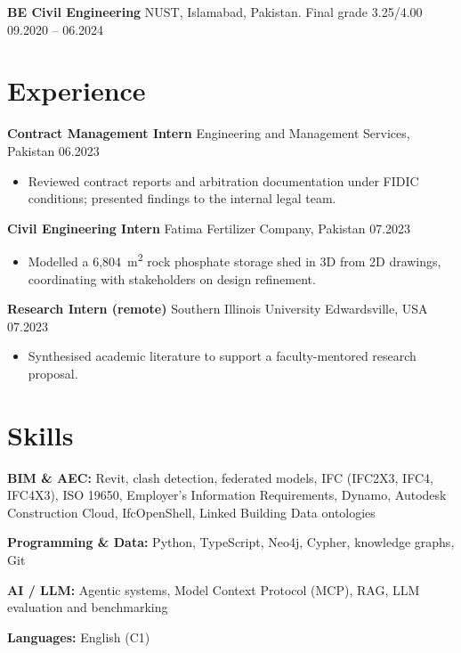 \documentclass[a4paper,10.5pt]{article}
\newcommand{\datefill}{\dotfill}
\newcommand{\entry}[3]{\vspace{2.5pt}\noindent\textbf{#1} \textbar{} #2 \datefill{} #3\par\vspace{0.5pt}}
\newcommand{\skillrow}[2]{\noindent\textbf{#1:} #2\par\vspace{1pt}}
\begin{document}
\entry{BE Civil Engineering}{NUST, Islamabad, Pakistan. Final grade 3.25/4.00}{09.2020 -- 06.2024}

\section{Experience}
\entry{Contract Management Intern}{Engineering and Management Services, Pakistan}{06.2023}
\begin{itemize}
  \item Reviewed contract reports and arbitration documentation under FIDIC
        conditions; presented findings to the internal legal team.
\end{itemize}

\entry{Civil Engineering Intern}{Fatima Fertilizer Company, Pakistan}{07.2023}
\begin{itemize}
  \item Modelled a 6,804~m\textsuperscript{2} rock phosphate storage shed in 3D from
        2D drawings, coordinating with stakeholders on design refinement.
\end{itemize}

\entry{Research Intern (remote)}{Southern Illinois University Edwardsville, USA}{07.2023}
\begin{itemize}
  \item Synthesised academic literature to support a faculty-mentored research proposal.
\end{itemize}

\section{Skills}

\skillrow{BIM \& AEC}{Revit, clash detection, federated models, IFC (IFC2X3, IFC4, IFC4X3), ISO 19650, Employer's Information Requirements, Dynamo, Autodesk Construction Cloud, IfcOpenShell, Linked Building Data ontologies}
\skillrow{Programming \& Data}{Python, TypeScript, Neo4j, Cypher, knowledge graphs, Git}
\skillrow{AI / LLM}{Agentic systems, Model Context Protocol (MCP), RAG, LLM evaluation and benchmarking}

\skillrow{Languages}{English (C1)}
\end{document}
